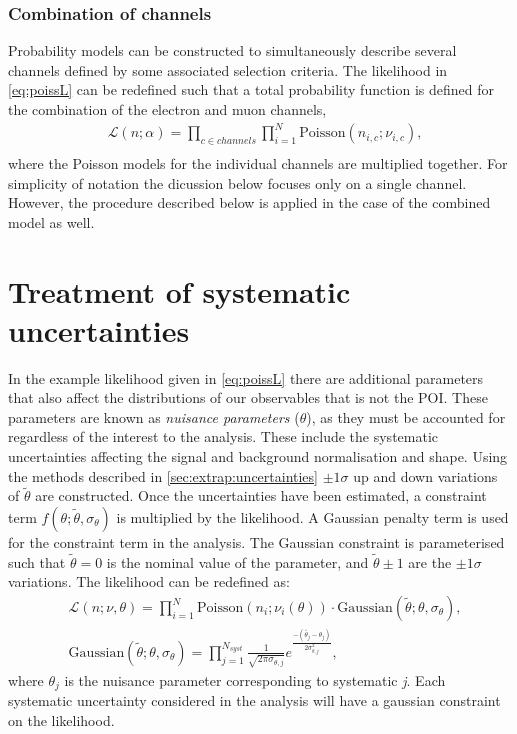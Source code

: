 \subsubsection{Combination of channels}
Probability models can be constructed to simultaneously describe several channels defined by some associated selection criteria. The likelihood in \cref{eq:poissL} can be redefined such that a total probability function is defined for the combination of the electron and muon channels, 
\begin{equation}
    \label{eq:poissLcomb}
    \begin{aligned}
        & \mathcal{L}(n;\alpha) = \prod_{c \in channels}\prod_{i=1}^{N}\mathrm{Poisson}(n_{i,c};\nu_{i,c}), \\
    \end{aligned}
\end{equation}
where the Poisson models for the individual channels are multiplied together. For simplicity of notation the dicussion below focuses only on a single channel. However, the procedure described below is applied in the case of the combined model as well. 

\section{Treatment of systematic uncertainties}
In the example likelihood given in \cref{eq:poissL} there are additional parameters that also affect the distributions of our observables that is not the POI. These parameters are known as \emph{nuisance parameters} ($\theta$), as they must be accounted for regardless of the interest to the analysis. These include the systematic uncertainties affecting the signal and background normalisation and shape. Using the methods described in \cref{sec:extrap:uncertainties} $\pm  1\sigma$ up and down variations of $\tilde{\theta}$ are constructed. Once the uncertainties have been estimated, a constraint term $f(\theta;\tilde{\theta},\sigma_\theta)$ is multiplied by the likelihood. A Gaussian penalty term is used for the constraint term in the analysis. The Gaussian constraint is parameterised such that $\tilde{\theta} = 0$ is the nominal value of the parameter, and $\tilde{\theta} \pm 1$ are the $\pm1\sigma$ variations. The likelihood can be redefined as:
\begin{equation}
    \label{eq:likelihood}
    \begin{aligned}
        & \mathcal{L}(n;\nu,\theta) = \prod_{i=1}^{N}\mathrm{Poisson}(n_i;\nu_i(\theta)) \cdot \mathrm{Gaussian}(\tilde{\theta};\theta,\sigma_\theta), \\
        & \mathrm{Gaussian}(\tilde{\theta};\theta,\sigma_\theta) = \prod_{j=1}^{N_{syst}} \frac{1}{\sqrt{2\pi\sigma_{\theta,j}}} e^\frac{-(\tilde{\theta_j} - \theta_j)}{2\sigma_{\theta,j}^2},
    \end{aligned}
\end{equation}
where $\theta_j$ is the nuisance parameter corresponding to systematic \emph{j}. Each systematic uncertainty considered in the analysis will have a gaussian constraint on the likelihood. 

